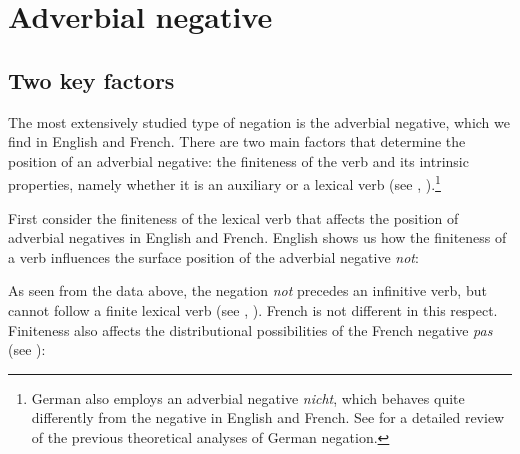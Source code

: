 \documentclass[output=paper
	        ,collection
	        ,collectionchapter
 	        ,biblatex
                ,babelshorthands
                ,newtxmath
                ,draftmode
                ,colorlinks, citecolor=brown
]{langscibook}
\begin{document}
{%
\section{Adverbial negative}

\subsection{Two key factors}


The most extensively studied type of negation is the adverbial negative, which
we find in English and French.
There are two main factors
that determine the position of an adverbial negative: the finiteness of
the verb and its intrinsic properties, namely whether it is an auxiliary
or a lexical  verb (see \citealt[Chapter~3]{Kim:00}, \citealt{KS:02}).\footnote{German also
employs an adverbial negative \textit{nicht}, which behaves quite
differently from the negative in English and French. See \citet[Section~11.7.1]{MuellerGT-Eng1}
for a detailed review of the previous theoretical analyses of German negation.}


First consider the finiteness of the lexical verb that affects
the position of adverbial
negatives in English and French.
English shows us how the finiteness of a verb influences the
surface position of the adverbial negative \textit{not}:

\begin{exe}
\ex\label{negation-eng-fin-neg} \begin{xlist}
\zl


\begin{exe}
\ex\label{negation-fr-fin-neg} \begin{xlist}
\zl
%
\noindent As seen from the data above, the negation \textit{not} precedes an infinitive verb, but cannot follow
a finite lexical  verb (see \citealt[Chapter~15]{Baker:89}, \citealt{Baker:91,Ernst:92}).
French is not different in this respect. Finiteness also affects the distributional possibilities of the French negative \emph{pas} (see \citealt{AG:97, KS:02, Zeijlstra:15}):

\eal
{}
\zl


\end{xlist}
\end{exe}
\end{xlist}
\end{exe}}
\end{document}
